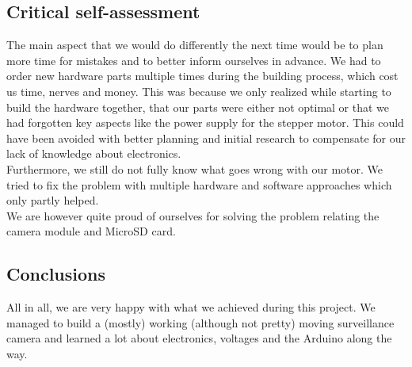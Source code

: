 \documentclass{article}
\begin{document}
\subsection{Critical self-assessment}
The main aspect that we would do differently the next time would be to plan more time for mistakes and to better inform ourselves in advance. We had to order new hardware parts multiple times during the building process, which cost us time, nerves and money. This was because we only realized while starting to build the hardware together, that our parts were either not optimal or that we had forgotten key aspects like the power supply for the stepper motor. This could have been avoided with better planning and initial research to compensate for our lack of knowledge about electronics.\\
Furthermore, we still do not fully know what goes wrong with our motor. We tried to fix the problem with multiple hardware and software approaches which only partly helped.\\
We are however quite proud of ourselves for solving the problem relating the camera module and MicroSD card.

\subsection{Conclusions}
All in all, we are very happy with what we achieved during this project. We managed to build a (mostly) working (although not pretty) moving surveillance camera and learned a lot about electronics, voltages and the Arduino along the way. 

\newpage

\printbibliography
\end{document}
